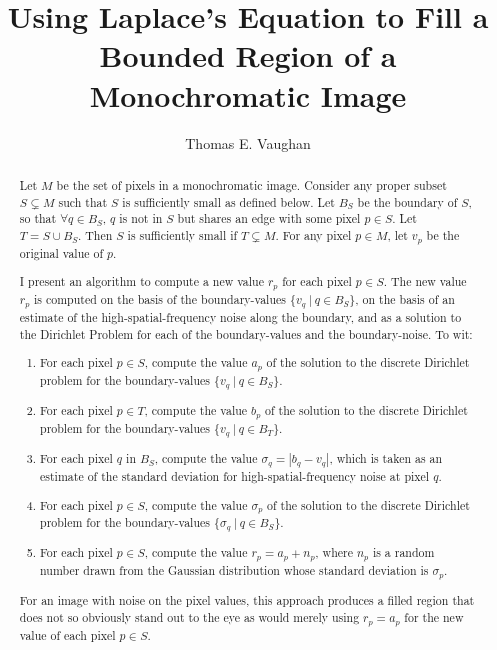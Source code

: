 \documentclass{article}
\title{%
Using Laplace's Equation to Fill a Bounded Region of a Monochromatic Image%
}
\author{Thomas E. Vaughan}
\newcommand{\foreach}{\forall}
\begin{document}
\maketitle

\begin{abstract}

   Let $M$ be the set of pixels in a monochromatic image.  Consider any proper
   subset $S \subsetneq M$ such that $S$ is sufficiently small as defined
   below.  Let $B_S$ be the boundary of $S$, so that $\foreach q \in B_S$, $q$
   is not in $S$ but shares an edge with some pixel $p \in S$.  Let $T = S \cup
   B_S$.  Then $S$ is sufficiently small if $T \subsetneq M$.  For any pixel $p
   \in M$, let $v_p$ be the original value of $p$.

   I present an algorithm to compute a new value $r_p$ for each pixel $p \in
   S$.  The new value $r_p$ is computed on the basis of the boundary-values
   $\{v_q \: | \: q \in B_S\}$, on the basis of an estimate of the
   high-spatial-frequency noise along the boundary, and as a solution to the
   Dirichlet Problem for each of the boundary-values and the boundary-noise.
   To wit:
   \begin{enumerate}
      \item For each pixel $p \in S$, compute the value $a_p$ of the solution
         to the discrete Dirichlet problem for the boundary-values $\{v_q \: |
         \: q \in B_S\}$.
      \item For each pixel $p \in T$, compute the value $b_p$ of the solution
         to the discrete Dirichlet problem for the boundary-values $\{v_q \: |
         \: q \in B_T\}$.
      \item For each pixel $q$ in $B_S$, compute the value $\sigma_q = |b_q -
         v_q|$, which is taken as an estimate of the standard deviation for
         high-spatial-frequency noise at pixel $q$.
      \item For each pixel $p \in S$, compute the value $\sigma_p$ of the
         solution to the discrete Dirichlet problem for the boundary-values
         $\{\sigma_q \: | \: q \in B_S\}$.
      \item For each pixel $p \in S$, compute the value $r_p = a_p + n_p$,
         where $n_p$ is a random number drawn from the Gaussian distribution
         whose standard deviation is $\sigma_p$.
   \end{enumerate}
   For an image with noise on the pixel values, this approach produces a filled
   region that does not so obviously stand out to the eye as would merely using
   $r_p = a_p$ for the new value of each pixel $p \in S$.

\end{abstract}
\end{document}
